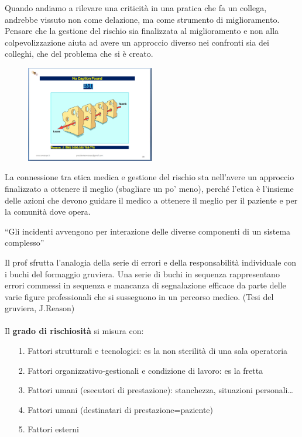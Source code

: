 Quando andiamo a rilevare una criticità in una pratica che fa un
collega, andrebbe vissuto non come delazione, ma come strumento di
miglioramento. Pensare che la gestione del rischio sia finalizzata al
miglioramento e non alla colpevolizzazione aiuta ad avere un approccio
diverso nei confronti sia dei colleghi, che del problema che si è
creato.

\begin{figure}[!ht]
\centering
	\includegraphics[width=0.5\textwidth]{30/image2.png}
	\end{figure}

La
connessione tra etica medica e gestione del rischio sta nell'avere un
approccio finalizzato a ottenere il meglio (sbagliare un po' meno),
perché l'etica è l'insieme delle azioni che devono guidare il medico a
ottenere il meglio per il paziente e per la comunità dove opera.

``Gli incidenti avvengono per interazione delle diverse componenti di un
sistema complesso''

Il prof sfrutta l'analogia della serie di errori e della responsabilità
individuale con i buchi del formaggio gruviera. Una serie di buchi in
sequenza rappresentano errori commessi in sequenza e mancanza di
segnalazione efficace da parte delle varie figure professionali che si
susseguono in un percorso medico. (Tesi del gruviera, J.Reason)
\\\\
Il \textbf{grado di rischiosità} si misura con:

\begin{itemize}
\item[1.]
  Fattori strutturali e tecnologici: es la non sterilità di una sala
  operatoria
\item[2.]
  Fattori organizzativo-gestionali e condizione di lavoro: es la fretta
\item[3.]
  Fattori umani (esecutori di prestazione): stanchezza, situazioni
  personali\ldots{}
\item[4.]
  Fattori umani (destinatari di prestazione=paziente)
\item[5.]
  Fattori esterni
\end{itemize}

